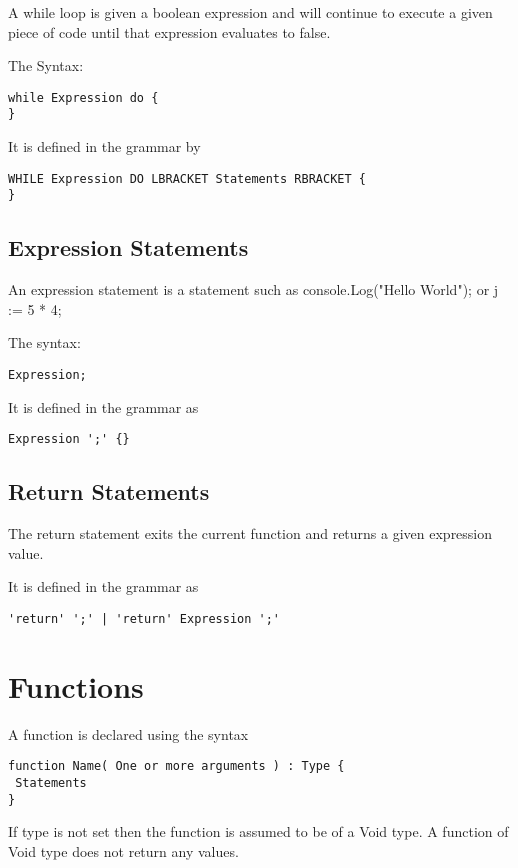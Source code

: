 \documentclass[]{final_report}
\begin{document}
A while loop is given a boolean expression and will continue to execute a given piece of code until that expression evaluates to false.

The Syntax: \begin{verbatim}
while Expression do {
}
\end{verbatim}

It is defined in the grammar by \begin{verbatim}
WHILE Expression DO LBRACKET Statements RBRACKET {
} 
\end{verbatim}

\section{Expression Statements}

An expression statement is a statement such as console.Log("Hello World"); or j := 5 * 4;

The syntax: \begin{verbatim}Expression;\end{verbatim}

It is defined in the grammar as \begin{verbatim}Expression ';' {}\end{verbatim}

\section{Return Statements}

The return statement exits the current function and returns a given expression value. 

It is defined in the grammar as
\begin{verbatim}
'return' ';' | 'return' Expression ';'
\end{verbatim}

\chapter{Functions}

A function is declared using the syntax

\begin{verbatim}
function Name( One or more arguments ) : Type {
 Statements
}
\end{verbatim}

If type is not set then the function is assumed to be of a Void type. A function of Void type does not return any values.
\end{document}
